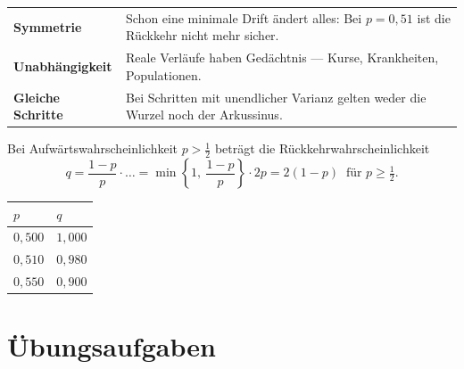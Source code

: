 \begin{warnung}
\begin{center}
{\small
\renewcommand{\arraystretch}{1.52}
\begin{tabular}{@{}P{2.6cm}P{6.0cm}@{}}
\toprule
\textbf{Symmetrie} & Schon eine minimale Drift ändert alles: Bei $p = 0{,}51$ ist die Rückkehr nicht mehr sicher.\\
\textbf{Unabhängigkeit} & Reale Verläufe haben Gedächtnis --- Kurse, Krankheiten, Populationen.\\
\textbf{Gleiche Schritte} & Bei Schritten mit unendlicher Varianz gelten weder die Wurzel noch der Arkussinus.\\
\bottomrule
\end{tabular}}
\end{center}

Bei Aufwärtswahrscheinlichkeit $p > \tfrac12$ beträgt die Rückkehrwahrscheinlichkeit
\[ q = \frac{1-p}{p}\cdot\ldots = \min\left\{1,\ \frac{1-p}{p}\right\}\cdot 2p = 2(1-p) \ \text{ für } p \ge \tfrac12 . \]
\begin{center}
{\small
\renewcommand{\arraystretch}{1.46}
\begin{tabular}{@{}P{1.8cm}P{2.4cm}@{}}
\toprule
$p$ & $q$\\
\midrule
$0{,}500$ & $1{,}000$\\
$0{,}510$ & $0{,}980$\\
$0{,}550$ & $0{,}900$\\
\bottomrule
\end{tabular}}
\end{center}

\begin{center}
\begin{minipage}{0.88\textwidth}
\end{minipage}
\end{center}
\end{warnung}

\section{Übungsaufgaben}

